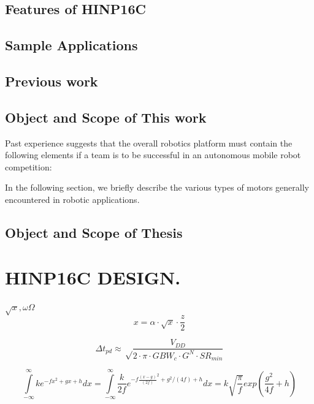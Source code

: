 \documentclass[12pt,oneside,final]{siuethesis}
\theoremstyle{definition}
\begin{document}
\section{Features of HINP16C}

\section{Sample Applications}

\section{Previous work}

\section{Object and Scope of This work} 


Past experience suggests that the overall robotics platform must contain the following elements if a team is to be successful in an autonomous mobile robot competition:

\noindent
In the following section, we briefly describe the various types of motors generally encountered in robotic applications.


\section{Object and Scope of Thesis}

\chapter{HINP16C DESIGN.}


$\sqrt{x}, \omega \Omega$
\begin{equation}
x = \alpha \cdot \sqrt{x} \cdot \frac{z}{2}
\end{equation}

\begin{equation}
\Delta t_{pd}  \approx \sqrt \frac{V_{DD}}{2 \cdot \pi \cdot GBW_{c} \cdot G^N \cdot SR_{min}}
\end{equation}

\begin{equation}
\int\limits_{-\infty}^\infty k e^{-fx^2+gx+h}dx= \int\limits_{-\infty}^\infty \frac{k}{2f}e^{-f \frac{(x-g)}{(2f)}^2+g^2/(4f)+h} dx= k \sqrt{\frac{\pi}{f}} exp( \frac{g^2}{4f}+h)
\end{equation}
\end{document}
